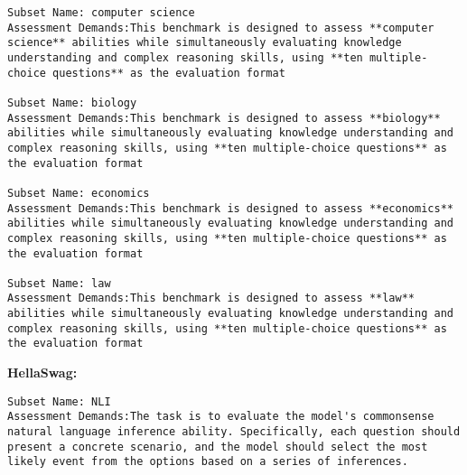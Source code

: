 \begin{lstlisting}
Subset Name: computer science
Assessment Demands:This benchmark is designed to assess **computer science** abilities while simultaneously evaluating knowledge understanding and complex reasoning skills, using **ten multiple-choice questions** as the evaluation format

Subset Name: biology
Assessment Demands:This benchmark is designed to assess **biology** abilities while simultaneously evaluating knowledge understanding and complex reasoning skills, using **ten multiple-choice questions** as the evaluation format

Subset Name: economics
Assessment Demands:This benchmark is designed to assess **economics** abilities while simultaneously evaluating knowledge understanding and complex reasoning skills, using **ten multiple-choice questions** as the evaluation format

Subset Name: law
Assessment Demands:This benchmark is designed to assess **law** abilities while simultaneously evaluating knowledge understanding and complex reasoning skills, using **ten multiple-choice questions** as the evaluation format
\end{lstlisting}

\textbf{HellaSwag:}
\label{sec:demand_hella}
\begin{lstlisting}
Subset Name: NLI
Assessment Demands:The task is to evaluate the model's commonsense natural language inference ability. Specifically, each question should present a concrete scenario, and the model should select the most likely event from the options based on a series of inferences.
\end{lstlisting}